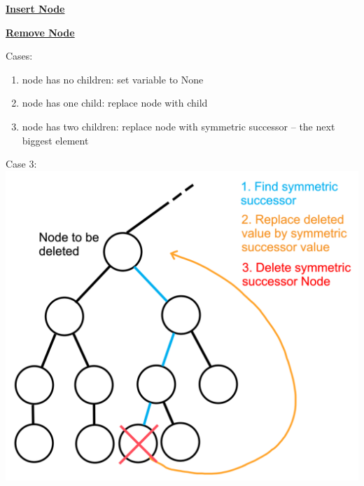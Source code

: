         {\centering\underline{\textbf{Insert Node}} \par}
            

        {\centering\underline{\textbf{Remove Node}} \par}
            \begin{minipage}{0.49\linewidth}
                Cases:
                \begin{enumerate}
                    \item node has no children: set variable to None
                    \item node has one child: replace node with child
                    \item node has two children: replace node with symmetric successor – the next biggest element
                \end{enumerate}
            \end{minipage}
            \begin{minipage}{0.49\linewidth}
                Case 3:\\
                \includegraphics*[width = \linewidth]{src/5_data_structure/images/symmetric_successor.png}
            \end{minipage}

            